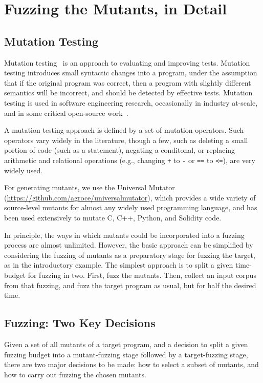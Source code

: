 \section{Fuzzing the Mutants, in Detail}


\subsection{Mutation Testing}

Mutation testing~\cite{MutationSurvey,budd1979mutation,demillo1978hints} is an approach to evaluating and improving tests.
Mutation testing introduces small syntactic changes into a program, under the assumption that if the original program was correct, 
then a program with slightly different semantics will be incorrect, and should be detected by effective tests. 
Mutation testing is used in software engineering research, occasionally in industry at-scale, and in some critical 
open-source work~\cite{mutKernel,mutGoogle,mutFacebook}.

A mutation testing approach is defined by a set of mutation operators.  Such operators vary widely in the literature,
though a few, such as deleting a small portion of code (such as a statement), negating a conditonal, or replacing arithmetic and
relational operations (e.g., changing {\tt +} to {\tt -} or {\tt ==} to {\tt <=}), are very widely used.

For generating mutants, we use the Universal Mutator \cite{regexpMut} (\url{https://github.com/agroce/universalmutator}),
which provides a wide variety of source-level mutants for almost any widely used programming language, and has been used
extensively to mutate C, C++, Python, and Solidity code.

In principle, the ways in which mutants could be incorporated into a fuzzing process are almost unlimited.  However, the basic
approach can be simplified by considering the fuzzing of mutants as a preparatory stage for fuzzing the target, as in the
introductory example.  The simplest approach is to split a given time-budget for fuzzing in two.  First, fuzz the mutants.
Then, collect an input corpus from that fuzzing, and fuzz the target program as usual, but for half the desired time.

\subsection{Fuzzing: Two Key Decisions}

Given a set of all mutants of a target program, and a decision to split a given fuzzing budget into a mutant-fuzzing stage
followed by a target-fuzzing stage, there are two major decisions to be made: how to select a subset of mutants, and how to
carry out fuzzing the chosen mutants.


